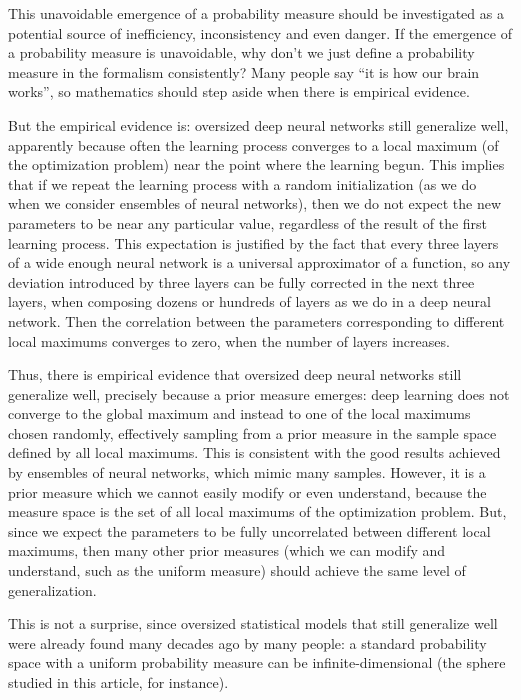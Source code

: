 \documentclass[11pt,a4paper]{report}
\begin{document}
This unavoidable emergence of a probability measure should be
investigated as a potential source of inefficiency, inconsistency and
even danger. If the emergence of a probability measure is unavoidable,
why don't we just define a probability measure in the formalism
consistently? Many people say ``it is how our brain works'', so
mathematics should step aside when there is empirical evidence.

But the empirical evidence is: oversized deep neural networks still
generalize well, apparently because often the learning process converges
to a local maximum (of the optimization problem) near the point where
the learning begun\cite{li2018learning}. This implies that if we repeat the learning process with a
random initialization (as we do when we consider ensembles of neural
networks\cite{lakshminarayanan2017simple}\cite{egele2022autodeuq}),
then we do not expect the new parameters to be near any particular
value, regardless of the result of the first learning process. This
expectation is justified by the fact that every three layers of a wide
enough neural network is a universal approximator of a
function\cite{hornik1989multilayer}, so any deviation introduced by three
layers can be fully corrected in the next three layers, when composing
dozens or hundreds of layers as we do in a deep neural network. Then the
correlation between the parameters corresponding to different local
maximums converges to zero, when the number of layers increases.

Thus, there is empirical evidence that oversized deep neural networks
still generalize well, precisely because a prior measure emerges: deep
learning does not converge to the global maximum and instead to one of
the local maximums chosen randomly, effectively sampling from a prior
measure in the sample space defined by all local maximums. This is
consistent with the good results achieved by ensembles of neural
networks\cite{lakshminarayanan2017simple}\cite{egele2022autodeuq},
which mimic many samples. However, it is a prior measure which we cannot
easily modify or even understand, because the measure space is the set
of all local maximums of the optimization problem. But, since we expect
the parameters to be fully uncorrelated between different local
maximums, then many other prior measures (which we can modify and
understand, such as the uniform measure) should achieve the same level
of generalization.

This is not a surprise, since oversized statistical models that still
generalize well were already found many decades ago by many
people\cite{Peterson2019GaussianLA}: a
standard probability space with a uniform probability measure can be
infinite-dimensional (the
sphere\cite{Peterson2019GaussianLA}
studied in this article, for instance).
\end{document}
